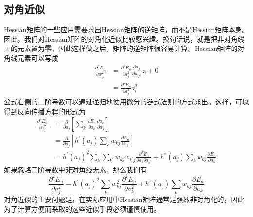 \subsection*{对角近似}
Hessian矩阵的一些应用需要求出Hessian矩阵的逆矩阵，而不是Hessian矩阵本身。因此，我们对Hessian矩阵的对角化近似比较感兴趣。换句话说，就是把非对角线上的元素置为零，因此这样做之后，矩阵的逆矩阵很容易计算。Hessian矩阵的对角线元素可以写成
\begin{equation}
\begin{aligned}
	\frac{\partial^2 E_n}{\partial w_{ji}^2}&=\frac{\partial^2 E_n}{\partial a_j^2}\frac{\partial a_j}{\partial w_{ji}}z_i+0\\
	&=\frac{\partial^2 E_n}{\partial a_j^2}z_i^2
\end{aligned}
\end{equation}
公式右侧的二阶导数可以通过递归地使用微分的链式法则的方式求出。这样，可以得到反向传播方程的形式为
\begin{equation}
\begin{aligned}
	\frac{\partial^2 E_n}{\partial a_j^2}&=\frac{\partial}{\partial a_j}\left[\sum_{k}\frac{\partial E_n}{\partial a_k}\frac{\partial a_k}{\partial a_j} \right]\\
	&=\frac{\partial}{\partial a_j}\left[h^{'}(a_j)\sum_{k}w_{kj}\frac{\partial E_n}{\partial a_k} \right]\\
	&=h^{'}(a_j)^2\sum_{k}\sum_{k^{'}}w_{kj}w_{k^{'}j}\frac{\partial^2 E_n}{\partial a_k\partial a_{k^{'}}}+h^{''}(a_j)\sum_{k}w_{kj}\frac{\partial E_n}{\partial a_k}
\end{aligned}
\end{equation}
如果忽略二阶导数中非对角线无素，那么我们有
\begin{equation}
	\frac{\partial^2 E_n}{\partial a_j^2}=h^{'}(a_j)^2\sum_{k}w_{kj}^2\frac{\partial^2 E_n}{\partial a_k^2}+h^{''}(a_j)\sum_{k}w_{kj}\frac{\partial E_n}{\partial a_k}
\end{equation}
对角近似的主要问题是，在实际应用中Hessian矩阵通常是强烈非对角化的，因此为了计算方便而采取的这些近似手段必须谨慎使用。

